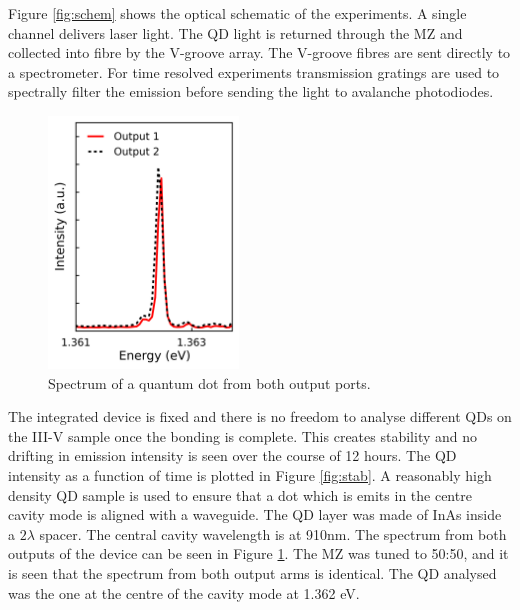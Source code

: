 Figure \ref{fig:schem} shows the optical schematic of the experiments. A single
channel delivers laser light. The QD light is returned through the MZ and
collected into fibre by the V-groove array. The V-groove fibres are sent
directly to a spectrometer. For time resolved experiments transmission gratings
are used to spectrally filter the emission before sending the light to avalanche
photodiodes.

\begin{figure}[h!] \begin{center}
\includegraphics[width=0.45\textwidth]{images/spec.png} \caption{Spectrum of a
quantum dot from both output ports.} \label{fig:spec} \end{center} \end{figure}

The integrated device is fixed and there is no freedom to analyse different QDs
on the III-V sample once the bonding is complete. This creates stability and no
drifting in emission intensity is seen over the course of 12 hours. The QD
intensity as a function of time is plotted in Figure \ref{fig:stab}. A
reasonably high density QD sample is used to ensure that a dot which is emits in
the centre cavity mode is aligned with a waveguide. The QD layer was made of
InAs inside a $2\lambda$ spacer. The central cavity wavelength is at 910nm. The
spectrum from both outputs of the device can be seen in Figure \ref{fig:spec}.
The MZ was tuned to 50:50, and it is seen that the spectrum from both output
arms is identical. The QD analysed was the one at the centre of the cavity mode
at 1.362 eV.

